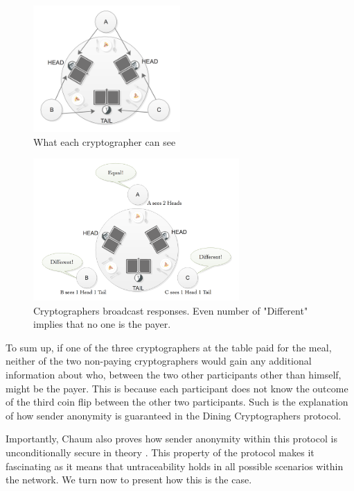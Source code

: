 \begin{figure}[h!]
    \centering
    \includegraphics[width=0.50\textwidth]{Images/DCstep2.png}
    \caption{What each cryptographer can see}
    \label{fig:dcstage2}
\end{figure}

\begin{figure}[h!]
    \centering
    \includegraphics[width=0.70\textwidth]{Images/DCstep3NoPayers.png}
    \caption{Cryptographers broadcast responses. Even number of "Different" implies that no one is the payer.}
    \label{fig:dcstage3}
\end{figure}

To sum up, if one of the three cryptographers at the table paid for the meal, neither of the two non-paying cryptographers would gain any additional information about who, between the two other participants other than himself, might be the payer. This is because each participant does not know the outcome of the third coin flip between the other two participants.  Such is the explanation of how sender anonymity is guaranteed in the Dining Cryptographers protocol. 

Importantly, Chaum also proves how sender anonymity within this protocol is unconditionally secure in theory \cite{Chaum}. This property of the protocol makes it fascinating as it means that untraceability holds in all possible scenarios within the network.  We turn now to present how this is the case. 


